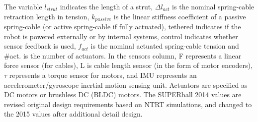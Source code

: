 \begin{table}[ht]
\caption{\SB{} and Related Robots Design Overview.} 
\label{design_req}

\begin{center}%
\end{center}
\bigskip
\fontsize{10pt}{12pt}\selectfont
The variable $l_{strut}$ indicates the length of a strut, $\Delta l_{act}$ is the nominal spring-cable retraction length in tension, $k_{passive}$ is the linear stiffness coefficient of a passive spring-cable (or active spring-cable if fully actuated), tethered indicates if the robot is powered externally or by internal systems, control indicates whether sensor feedback is used, $f_{act}$ is the nominal actuated spring-cable tension and \#act. is the number of actuators. In the sensors column, F represents a linear force sensor (for cables), L is cable length sensor (in the form of motor encoders), $\tau$ represents a torque sensor for motors, and IMU represents an accelerometer/gyroscope inertial motion sensing unit. Actuators are specified as DC motors or brushless DC (BLDC) motors. The SUPERball 2014 values are revised original design requirements based on NTRT simulations, and changed to the 2015 values after additional detail design. %

\vspace{-0.2cm}

\end{table}

